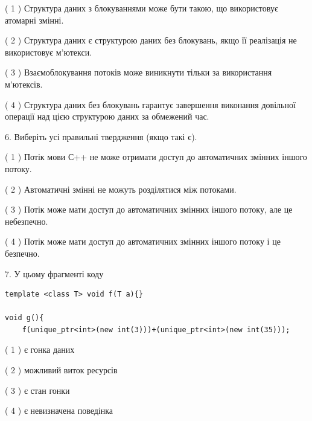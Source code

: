 \documentclass[12pt, ukrainian]{article}
\begin{document}
\begin {large}
{( 1 ) Структура даних з блокуваннями може бути такою, що використовує атомарні змінні.%

( 2 ) Структура даних є структурою даних без блокувань, якщо її реалізація не використовує м’ютекси.%

( 3 ) Взаємоблокування потоків може виникнути тільки за використання м’ютексів.%

( 4 ) Структура даних без блокувань гарантує завершення виконання довільної операції над цією структурою даних за обмежений час.%
\newpage



\vspace{5mm}
6. Виберіть усі правильні твердження (якщо такі є).\par
\vspace{2mm}

( 1 ) Потік мови С++ не може отримати доступ до автоматичних змінних іншого потоку.%

( 2 ) Автоматичні змінні не можуть розділятися між потоками.%

( 3 ) Потік може мати доступ до автоматичних змінних іншого потоку, але це небезпечно.%

( 4 ) Потік може мати доступ до автоматичних змінних іншого потоку і це безпечно.%


\vspace{5mm}
7. У цьому фрагменті коду
\begin{verbatim}
template <class T> void f(T a){}

void g(){
    f(unique_ptr<int>(new int(3)))+(unique_ptr<int>(new int(35)));
\end{verbatim}

( 1 ) є гонка даних%

( 2 ) можливий виток ресурсів%

( 3 ) є стан гонки%

( 4 ) є невизначена поведінка%
}
\end {large}
\end{document}
